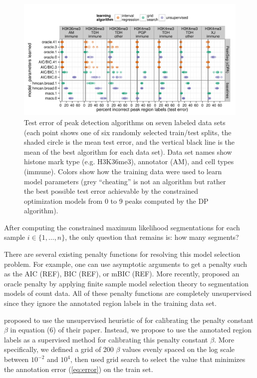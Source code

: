 \documentclass{article}
\begin{document}
\begin{figure}[b!]
  \centering
  \includegraphics[width=\textwidth]{figure-dp-peaks-regression-dots}
  \vskip -0.5cm
  \caption{Test error of peak detection algorithms on seven labeled
    data sets (each point shows one of six randomly selected
    train/test splits, the shaded circle is the mean test error, and
    the vertical black line is the mean of the best algorithm for each
    data set). Data set names show histone mark type (e.g. H3K36me3),
    annotator (AM), and cell types (immune). Colors show how the
    training data were used to learn model parameters (grey
    ``cheating'' is not an algorithm but rather the best possible test
    error achievable by the constrained optimization models from 0 to
    9 peaks computed by the DP algorithm).}
  \label{fig:test-error}
\end{figure}

After computing the constrained maximum likelihood segmentations for
each sample $i\in\{1,\dots, n\}$, the only question that remains is:
how many segments?

There are several existing penalty functions for resolving this model
selection problem. For example, one can use asymptotic arguments to
get a penalty such as the AIC (REF), BIC (REF), or mBIC (REF). More
recently, \citet{cleynen2013segmentation} proposed an oracle penalty
by applying finite sample model selection theory to segmentation
models of count data. All of these penalty functions are completely
unsupervised since they ignore the annotated region labels in the
training data set.

\citet{cleynen2013segmentation} proposed to use the 
un\-supervised heuristic of \citet{Lav05} for calibrating the penalty
constant $\beta$ in equation (6) of their paper. Instead, we propose to
use the annotated region labels as a super\-vised method for calibrating
this penalty constant $\beta$. More specifically, we defined a grid of
200 $\beta$ values evenly spaced on the log scale between $10^{-2}$
and $10^4$, then used grid search to select the value that minimizes
the annotation error (\ref{eq:error}) on the train set.
\end{document}
